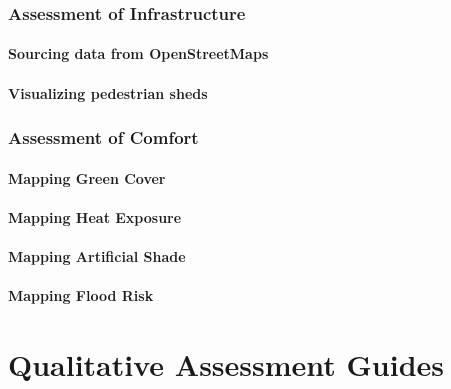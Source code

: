 \documentclass[
]{latex/krantz}
\begin{document}
\hypertarget{assessment-of-infrastructure}{%
\section{Assessment of Infrastructure}\label{assessment-of-infrastructure}}

\hypertarget{sourcing-data-from-openstreetmaps}{%
\subsection{Sourcing data from OpenStreetMaps}\label{sourcing-data-from-openstreetmaps}}

\hypertarget{visualizing-pedestrian-sheds}{%
\subsection{Visualizing pedestrian sheds}\label{visualizing-pedestrian-sheds}}

\hypertarget{assessment-of-comfort}{%
\section{Assessment of Comfort}\label{assessment-of-comfort}}

\hypertarget{mapping-green-cover}{%
\subsection{Mapping Green Cover}\label{mapping-green-cover}}

\hypertarget{mapping-heat-exposure}{%
\subsection{Mapping Heat Exposure}\label{mapping-heat-exposure}}

\hypertarget{mapping-artificial-shade}{%
\subsection{Mapping Artificial Shade}\label{mapping-artificial-shade}}

\hypertarget{mapping-flood-risk}{%
\subsection{Mapping Flood Risk}\label{mapping-flood-risk}}

\hypertarget{part-qualitative-assessment-guides}{%
\part{Qualitative Assessment Guides}\label{part-qualitative-assessment-guides}}
\end{document}

